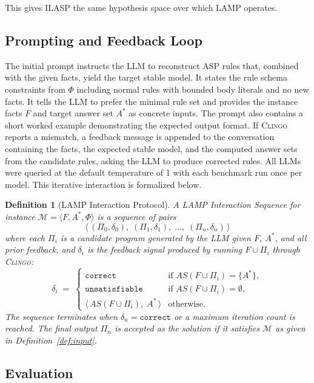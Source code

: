 \documentclass[11pt,a4paper]{article}
\newtheorem{definition}{Definition}
\begin{document}
This gives ILASP the same hypothesis space over which LAMP operates.

\subsection{Prompting and Feedback Loop}

The initial prompt instructs the LLM to reconstruct ASP rules that, combined with the given facts, yield the target stable model. It states the rule schema constraints from $\Phi$ including normal rules with bounded body literals and no new facts. It tells the LLM to prefer the minimal rule set and provides the instance facts $F$ and target answer set $A^*$ as concrete inputs. The prompt also contains a short worked example demonstrating the expected output format. If \textsc{Clingo} reports a mismatch, a feedback message is appended to the conversation containing the facts, the expected stable model, and the computed answer sets from the candidate rules, asking the LLM to produce corrected rules. All LLMs were queried at the default temperature of 1 with each benchmark run once per model. This iterative interaction is formalized below.

\begin{definition}[LAMP Interaction Protocol]
\label{def:protocol}
A \emph{LAMP Interaction Sequence} for instance $\mathcal{M} = \langle F, A^{*}, \Phi \rangle$
is a sequence of pairs
\[
  \bigl\langle\,
    (\Pi_0,\delta_0),\; (\Pi_1,\delta_1),\; \ldots,\; (\Pi_n,\delta_n)
  \,\bigr\rangle
\]
where each $\Pi_i$ is a candidate program generated by the LLM given $F$, $A^{*}$, and all prior feedback,
and $\delta_i$ is the \emph{feedback signal} produced by running $F \cup \Pi_i$ through \textsc{Clingo}:
\[
  \delta_i \;=\;
  \begin{cases}
    \texttt{correct}
      & \text{if } AS(F \cup \Pi_i) = \{A^{*}\}, \\[4pt]
    \texttt{unsatisfiable}
      & \text{if } AS(F \cup \Pi_i) = \emptyset, \\[4pt]
    \bigl\langle\, AS(F \cup \Pi_i),\; A^{*} \,\bigr\rangle
      & \text{otherwise.}
  \end{cases}
\]
The sequence terminates when $\delta_n = \texttt{correct}$ or a maximum iteration count is reached.
The final output $\Pi_n$ is accepted as the solution if it satisfies $\mathcal{M}$ as given in Definition~\ref{def:input}.
\end{definition}

\subsection{Evaluation}
\end{document}
